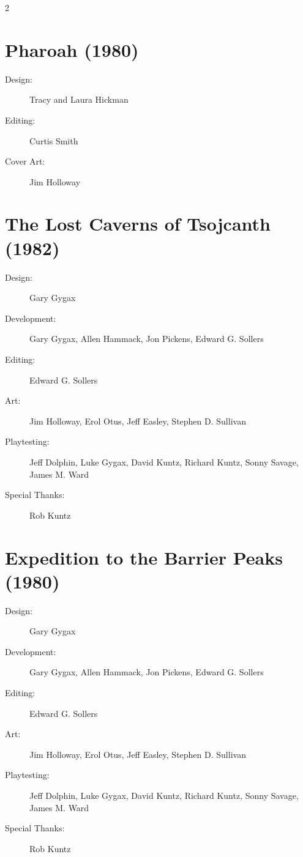 \documentclass[10pt,a4paper,twoside,bg=print,twocolumn,openany,nodeprecatedcode]{dndbook}
\begin{document}
\begin{description}
\begin{multicols}{2}
\section{Pharoah (1980)}

\begin{description}
\item[Design:]
Tracy and Laura Hickman
\item[Editing:]
Curtis Smith
\item[Cover Art:]
Jim Holloway
\end{description}

\section{The Lost Caverns of Tsojcanth (1982)}

\begin{description}
\item[Design:]
Gary Gygax
\item[Development:]
Gary Gygax, Allen Hammack, Jon Pickens, Edward G. Sollers
\item[Editing:]
Edward G. Sollers
\item[Art:]
Jim Holloway, Erol Otus, Jeff Easley, Stephen D. Sullivan
\item[Playtesting:]
Jeff Dolphin, Luke Gygax, David Kuntz, Richard Kuntz, Sonny Savage, James M. Ward
\item[Special Thanks:]
Rob Kuntz
\end{description}

\section{Expedition to the Barrier Peaks (1980)}

\begin{description}
\item[Design:]
Gary Gygax
\item[Development:]
Gary Gygax, Allen Hammack, Jon Pickens, Edward G. Sollers
\item[Editing:]
Edward G. Sollers
\item[Art:]
Jim Holloway, Erol Otus, Jeff Easley, Stephen D. Sullivan
\item[Playtesting:]
Jeff Dolphin, Luke Gygax, David Kuntz, Richard Kuntz, Sonny Savage, James M. Ward
\item[Special Thanks:]
Rob Kuntz
\end{description}

\end{multicols}

\end{description}
\end{document}
